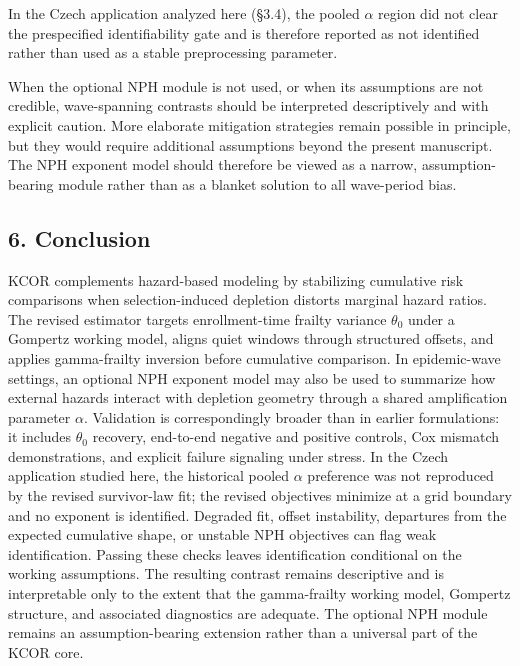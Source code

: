 \documentclass[
]{article}
\begin{document}
In the Czech application analyzed here (§3.4), the pooled \(\alpha\) region did not clear the prespecified identifiability gate and is therefore reported as not identified rather than used as a stable preprocessing parameter.

When the optional NPH module is not used, or when its assumptions are not credible, wave-spanning contrasts should be interpreted descriptively and with explicit caution. More elaborate mitigation strategies remain possible in principle, but they would require additional assumptions beyond the present manuscript. The NPH exponent model should therefore be viewed as a narrow, assumption-bearing module rather than as a blanket solution to all wave-period bias.

\subsection{6. Conclusion}\label{conclusion}

KCOR complements hazard-based modeling by stabilizing cumulative risk comparisons when selection-induced depletion distorts marginal hazard ratios. The revised estimator targets enrollment-time frailty variance \(\theta_0\) under a Gompertz working model, aligns quiet windows through structured offsets, and applies gamma-frailty inversion before cumulative comparison. In epidemic-wave settings, an optional NPH exponent model may also be used to summarize how external hazards interact with depletion geometry through a shared amplification parameter \(\alpha\). Validation is correspondingly broader than in earlier formulations: it includes \(\theta_0\) recovery, end-to-end negative and positive controls, Cox mismatch demonstrations, and explicit failure signaling under stress. In the Czech application studied here, the historical pooled \(\alpha\) preference was not reproduced by the revised survivor-law fit; the revised objectives minimize at a grid boundary and no exponent is identified. Degraded fit, offset instability, departures from the expected cumulative shape, or unstable NPH objectives can flag weak identification. Passing these checks leaves identification conditional on the working assumptions. The resulting contrast remains descriptive and is interpretable only to the extent that the gamma-frailty working model, Gompertz structure, and associated diagnostics are adequate. The optional NPH module remains an assumption-bearing extension rather than a universal part of the KCOR core.

\newpage
\end{document}
